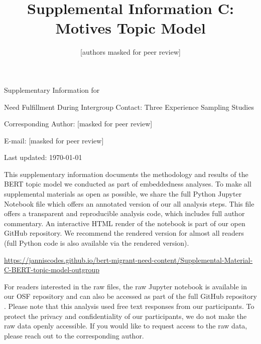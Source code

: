 \documentclass[man, 12pt, a4paper]{apa7}
\title{Supplemental Information C: Motives Topic Model}
\author{[authors masked for peer review]}
\begin{document}
\begin{titlepage}
	{\noindent\Large Supplementary Information for \par}
	\vspace{0.5cm}
	{\noindent\Large Need Fulfillment During Intergroup Contact: Three Experience Sampling Studies\par}
	\vspace{1.5cm}
	{\noindent\LARGE\bfseries \thetitle \par}
	\vspace{2cm}
	{\noindent\Large\itshape \theauthor \par}
	\vfill
	\noindent Corresponding Author: [masked for peer review]\par
	\noindent E-mail: [masked for peer review]\par
	\vfill

	{\noindent Last updated: \today\par}
\end{titlepage}

\begin{center}
   \textbf{\thetitle} 
\end{center}

This supplementary information documents the methodology and results of the BERT topic model we conducted as part of embeddedness analyses. To make all supplemental materials as open as possible, we share the full Python Jupyter Notebook file which offers an annotated version of our all analysis steps. This file offers a transparent and reproducible analysis code, which includes full author commentary. An interactive HTML render of the notebook is part of our open GitHub repository. We recommend the rendered version for almost all readers (full Python code is also available via the rendered version).

\vspace{.5cm}
\begin{tcolorbox}
    \vspace{0.2cm} \centering 
    \href{https://janniscodes.github.io/bert-migrant-need-content/Supplemental-Material-C-BERT-topic-model-outgroup}{https://janniscodes.github.io/bert-migrant-need-content/Supplemental-Material-C-BERT-topic-model-outgroup}
    \vspace{0.2cm} 
\end{tcolorbox}

For readers interested in the raw files, the raw Jupyter notebook is available in our OSF repository \citep[see][]{KreienkampMasked2022a} and can also be accessed as part of the full GitHub repository \citep[][]{KreienkampMasked2022}. Please note that this analysis used free text responses from our participants. To protect the privacy and confidentiality of our participants, we do not make the raw data openly accessible. If you would like to request access to the raw data, please reach out to the corresponding author.

\printbibliography
\end{document}

